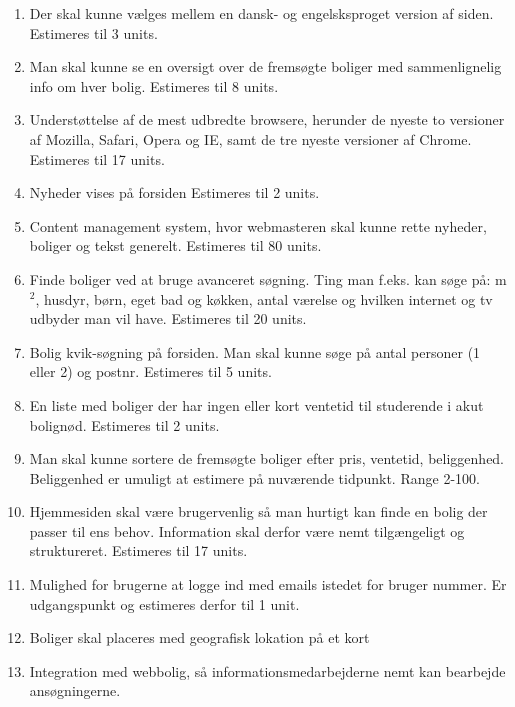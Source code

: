 \documentclass[12pt, a4paper]{report}
\begin{document}
\begin{enumerate}

\item Der skal kunne vælges mellem en dansk- og engelsksproget version af siden. Estimeres til 3 units.

\item Man skal kunne se en oversigt over de fremsøgte boliger med sammenlignelig info om hver bolig. Estimeres til 8 units.

\item Understøttelse af de mest udbredte browsere, herunder de nyeste to versioner af Mozilla, Safari, Opera og IE, samt de tre nyeste versioner af Chrome. Estimeres til 17 units.

\item Nyheder vises på forsiden Estimeres til 2 units.

\item Content management system, hvor webmasteren skal kunne rette nyheder, boliger og tekst generelt. Estimeres til 80 units.

\item Finde boliger ved at bruge avanceret søgning. Ting man f.eks. kan søge på: m$^{2}$, husdyr, børn, eget bad og køkken, antal værelse og hvilken internet og tv udbyder man vil have. Estimeres til 20 units.

\item Bolig kvik-søgning på forsiden. Man skal kunne søge på antal personer (1 eller 2) og postnr. Estimeres til 5 units.

\item En liste med boliger der har ingen eller kort ventetid til studerende i akut bolignød. Estimeres til 2 units.

\item Man skal kunne sortere de fremsøgte boliger efter pris, ventetid, beliggenhed. Beliggenhed er umuligt at estimere på nuværende tidpunkt. Range 2-100.

\item Hjemmesiden skal være brugervenlig så man hurtigt kan finde en bolig der passer til ens behov. Information skal derfor være nemt tilgængeligt og struktureret. Estimeres til 17 units.

\item Mulighed for brugerne at logge ind med emails istedet for bruger nummer. Er udgangspunkt og estimeres derfor til 1 unit.

\item Boliger skal placeres med geografisk lokation på et kort

\item Integration med webbolig, så informationsmedarbejderne nemt kan bearbejde ansøgningerne.

\end{enumerate}
\end{document}
